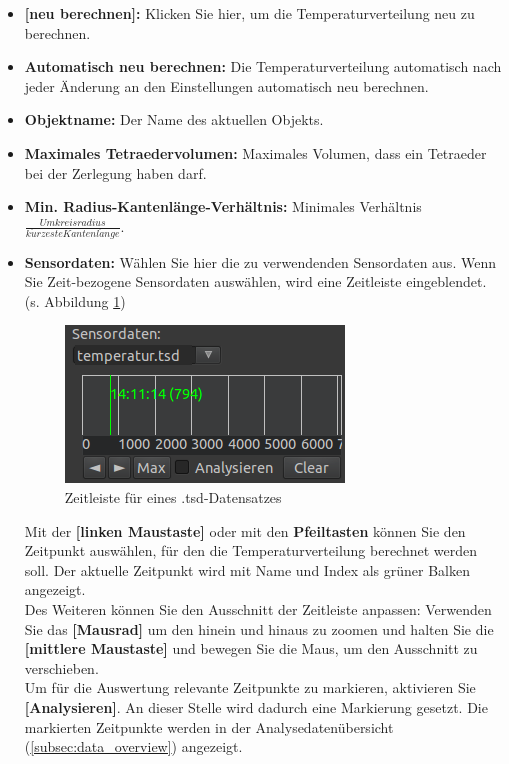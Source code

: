 \documentclass[10pt,a5paper,twoside,titlepage]{scrartcl}
\begin{document}
	\begin{itemize}
	\item \textbf{[neu berechnen]:} Klicken Sie hier, um die Temperaturverteilung neu zu berechnen.
	\item \textbf{Automatisch neu berechnen:} Die Temperaturverteilung automatisch nach jeder Änderung an den Einstellungen automatisch neu berechnen.
	\item \textbf{Objektname:} Der Name des aktuellen Objekts.
	\item \textbf{Maximales Tetraedervolumen:} Maximales Volumen, dass ein Tetraeder bei der Zerlegung haben darf.
	\item \textbf{Min. Radius-Kantenlänge-Verhältnis:} Minimales Verhältnis $\frac{Umkreisradius}{k\ddot{u}rzeste Kantenl\ddot{a}nge}$.
	\item \textbf{Sensordaten:} Wählen Sie hier die zu verwendenden Sensordaten aus. Wenn Sie Zeit-bezogene Sensordaten auswählen, wird eine Zeitleiste eingeblendet. (s. Abbildung \ref{fig:sa_timeline})
	\begin{figure}
	\centering
	\includegraphics[trim=0cm 0cm 0cm 0cm,clip=true,scale=.54]{Simple_Analyzer_timeline.png}
	\caption{Zeitleiste für eines .tsd-Datensatzes}
	\label{fig:sa_timeline}
	\end{figure}
	Mit der \textbf{[linken Maustaste]} oder mit den \textbf{Pfeiltasten} können Sie den Zeitpunkt auswählen, für den die Temperaturverteilung berechnet werden soll. Der aktuelle Zeitpunkt wird mit Name und Index als grüner Balken angezeigt.\\
	Des Weiteren können Sie den Ausschnitt der Zeitleiste anpassen:
	Verwenden Sie das \textbf{[Mausrad]} um den hinein und hinaus zu zoomen und halten Sie die \textbf{[mittlere Maustaste]} und bewegen Sie die Maus, um den Ausschnitt zu verschieben.\\
	Um für die Auswertung relevante Zeitpunkte zu markieren, aktivieren Sie \textbf{[Analysieren]}. An dieser Stelle wird dadurch eine Markierung gesetzt. Die markierten Zeitpunkte werden in der Analysedatenübersicht (\ref{subsec:data_overview}) angezeigt.
	\begin{itemize}

\end{itemize}
\end{itemize}
\end{document}
